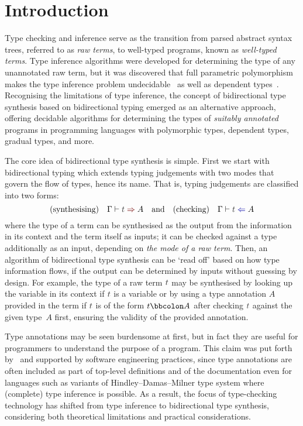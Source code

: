 
\section{Introduction}\label{sec:intro}

Type checking and inference serve as the transition from parsed abstract syntax trees, referred to as \emph{raw terms}, to well-typed programs, known as \emph{well-typed terms}.
Type inference algorithms were developed for determining the type of any unannotated raw term, but it was discovered that full parametric polymorphism makes the type inference problem undecidable~\citep{Wells1999} as well as dependent types~\citep{Dowek1993}.
Recognising the limitations of type inference, the concept of bidirectional type synthesis based on bidirectional typing emerged as an alternative approach, offering decidable algorithms for determining the types of \emph{suitably annotated} programs in programming languages with polymorphic types, dependent types, gradual types, and more.

The core idea of bidirectional type synthesis is simple.
First we start with bidirectional typing which extends typing judgements with two modes that govern the flow of types, hence its name.
That is, typing judgements are classified into two forms:
  \[
    (\text{synthesising})\quad \Gamma \vdash \isTerm{t} \syn A
    \quad\text{and}\quad
    (\text{checking})\quad \Gamma \vdash \isTerm{t} \chk A
  \]
where the type of a term can be synthesised as the output from the information in its context and the term itself as inputs; it can be checked against a type additionally as an input, depending on \emph{the mode of a raw term}.
Then, an algorithm of bidirectional type synthesis can be `read off' based on how type information flows, if the output can be determined by inputs without guessing by design.
  For example, the type of a raw term $\isTerm{t}$ may be synthesised by looking up the variable in its context if $\isTerm{t}$ is a variable or by using a type annotation $A$ provided in the term if $\isTerm{t}$ is of the form $t \annotate A$ after checking $\isTerm{t}$ against the given type~$A$ first, ensuring the validity of the provided annotation.

Type annotations may be seen burdensome at first, but in fact they are useful for programmers to understand the purpose of a program.
This claim was put forth by~\citet{Pierce2000} and supported by software engineering practices, since type annotations are often included as part of top-level definitions and of the documentation even for languages such as variants of Hindley--Damas--Milner type system where (complete) type inference is possible.
As a result, the focus of type-checking technology has shifted from type inference to bidirectional type synthesis, considering both theoretical limitations and practical considerations.


